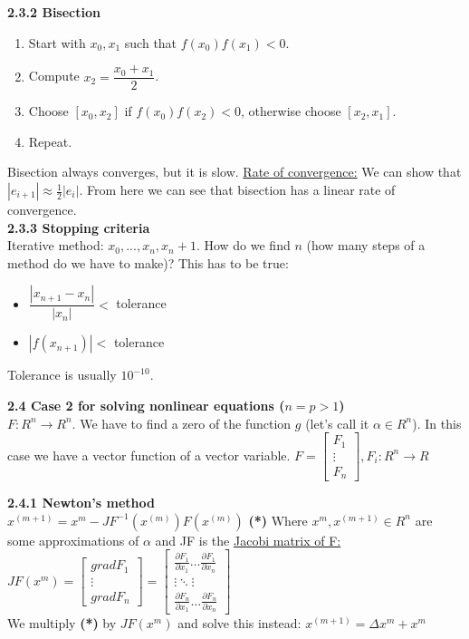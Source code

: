 \documentclass{article}
\begin{document}
\begin{multicols}{2}
	\textbf{2.3.2 Bisection}
	\begin{enumerate}
		\item Start with $x_0, x_1$ such that $f(x_0)f(x_1) < 0$.
		\item Compute $x_2 = \dfrac{x_0 + x_1}{2}$.
		\item Choose $[x_0, x_2]$ if $f(x_0)f(x_2) < 0$, otherwise choose $[x_2, x_1]$.
		\item Repeat.
	\end{enumerate}
	Bisection always converges, but it is slow.
	\underline{Rate of convergence:}
	We can show that $|e_{i+1}| \approx \frac{1}{2}|e_i|$. From here we can see that bisection has
	a linear rate of convergence.\\

	\textbf{2.3.3 Stopping criteria}\\
	Iterative method: $x_0,..., x_n, x_n+1$. How do we find $n$ (how many steps of a method
	do we have to make)? This has to be true:
	\begin{itemize}
		\item $\dfrac{|x_{n+1} - x_n|}{|x_n|} <$ tolerance
		\item $|f(x_{n+1})|<$ tolerance
	\end{itemize}
	Tolerance is usually $10^{-10}$.

	\textbf{2.4 Case 2 for solving nonlinear equations ($n = p > 1$)}\\
	$F: R^n \rightarrow R^n$. We have to find a zero of the function $g$ (let's call it $\alpha \in R^n$).
	In this case we have a vector function of a vector variable.
	$F =
		\begin{bmatrix}
			F_1    \\
			\vdots \\
			F_n
		\end{bmatrix}
		, F_i: R^n \rightarrow R$

	\textbf{2.4.1 Newton's method}\\
	$x^{(m+1)} = x^{m} - JF^{-1}(x^{(m)})F(x^{(m)})$ \textbf{(*)}
	Where $x^{m}, x^{(m+1)} \in R^n$ are some approximations of $\alpha$
	and JF is the \underline{Jacobi matrix of F:} $JF(x^{m}) =
		\begin{bmatrix}
			grad F_1 \\
			\vdots   \\
			grad F_n
		\end{bmatrix}
		=
		\begin{bmatrix}
			\frac{\partial F_1}{\partial x_1} \dots \frac{\partial F_1}{\partial x_n} \\
			\vdots \ddots \vdots                                                      \\
			\frac{\partial F_n}{\partial x_1} \dots \frac{\partial F_n}{\partial x_n}
		\end{bmatrix}
	$ \\
	We multiply \textbf{(*)} by $JF(x^{m})$ and solve this instead:
	$x^{(m+1)} = \Delta x^{m} + x^{m}$


\end{multicols}
\end{document}
